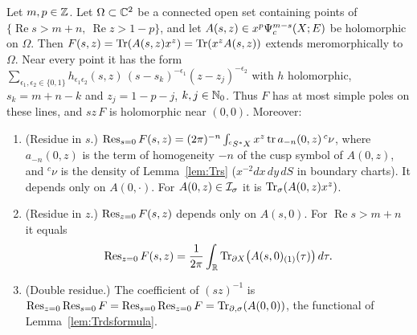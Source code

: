 \begin{theorem}\label{tr:thm:mero}
Let \(m,p\in\mathbb Z\). Let \(\Omega\subset\mathbb C^2\) be a connected open set
containing points of \(\{\operatorname{Re}s>m+n,\ \operatorname{Re}z>1-p\}\),
and let \(A(s,z)\in x^p\Psi_{c}^{m-s}(X;E)\) be holomorphic on \(\Omega\). Then
\(F(s,z)=\operatorname{Tr}(A(s,z)x^z)=\operatorname{Tr}(x^zA(s,z))\) extends meromorphically to
\(\Omega\). Near every point it has the form
\(\sum_{\epsilon_1,\epsilon_2\in\{0,1\}}h_{\epsilon_1\epsilon_2}(s,z)\,
(s-s_k)^{-\epsilon_1}(z-z_j)^{-\epsilon_2}\) with \(h\) holomorphic,
\(s_k=m+n-k\) and \(z_j=1-p-j\), \(k,j\in\mathbb N_0\). Thus \(F\) has at most simple
poles on these lines, and \(sz\,F\) is holomorphic near \((0,0)\).
Moreover:
\begin{enumerate}
\item (Residue in \(s\).) \(\operatorname{Res}_{s=0}F(s,z)=(2\pi)^{-n}\int_{{}^cS^*X}x^z\operatorname{tr}
a_{-n}(0,z)\,{}^c\nu\), where \(a_{-n}(0,z)\) is the term of homogeneity
\(-n\) of the cusp symbol of \(A(0,z)\), and \({}^c\nu\) is the density of
Lemma~\ref{lem:Trs} (\(x^{-2}dx\,dy\,dS\) in boundary charts). It depends
only on \(A(0,\cdot)\). For \(A(0,z)\in\mathcal I_\sigma\) it is \(\operatorname{Tr}_\sigma(A(0,z)x^z)\).
\item (Residue in \(z\).) \(\operatorname{Res}_{z=0}F(s,z)\) depends only on \(A(s,0)\).
For \(\operatorname{Re}s>m+n\) it equals
\[
 \operatorname{Res}_{z=0}F(s,z)=\frac1{2\pi}\int_{\mathbb R}\operatorname{Tr}_{\partial X}\bigl(A(s,0)_{(1)}(\tau)
 \bigr)\,d\tau .
\]
\item (Double residue.) The coefficient of \((sz)^{-1}\) is
\(\operatorname{Res}_{z=0}\operatorname{Res}_{s=0}F=\operatorname{Res}_{s=0}\operatorname{Res}_{z=0}F=\operatorname{Tr}_{\partial,\sigma}(A(0,0))\), the
functional of Lemma~\ref{lem:Trdsformula}.
\end{enumerate}
\end{theorem}

